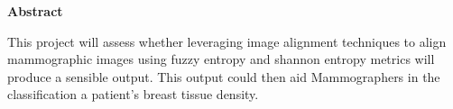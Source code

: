 \thispagestyle{empty}

\begin{center}
    {\LARGE\bf Abstract}
\end{center}

This project will assess whether leveraging image alignment techniques to align mammographic images using fuzzy entropy and shannon entropy metrics will produce a sensible output. This output could then aid Mammographers in the classification a patient's breast tissue density.
